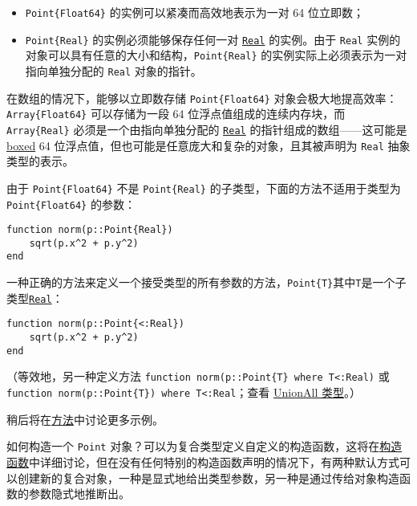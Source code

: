 \begin{itemize}
\item \texttt{Point\{Float64\}} 的实例可以紧凑而高效地表示为一对 64 位立即数；


\item \texttt{Point\{Real\}} 的实例必须能够保存任何一对 \hyperlink{6175959395021454412}{\texttt{Real}} 的实例。由于 \texttt{Real} 实例的对象可以具有任意的大小和结构，\texttt{Point\{Real\}} 的实例实际上必须表示为一对指向单独分配的 \texttt{Real} 对象的指针。

\end{itemize}


在数组的情况下，能够以立即数存储 \texttt{Point\{Float64\}} 对象会极大地提高效率：\texttt{Array\{Float64\}} 可以存储为一段 64 位浮点值组成的连续内存块，而 \texttt{Array\{Real\}} 必须是一个由指向单独分配的 \hyperlink{6175959395021454412}{\texttt{Real}} 的指针组成的数组——这可能是 \href{https://en.wikipedia.org/wiki/Object\_type\_\%28object-oriented\_programming\%29\#Boxing}{boxed} 64 位浮点值，但也可能是任意庞大和复杂的对象，且其被声明为 \texttt{Real} 抽象类型的表示。



由于 \texttt{Point\{Float64\}} 不是 \texttt{Point\{Real\}} 的子类型，下面的方法不适用于类型为 \texttt{Point\{Float64\}} 的参数：




\begin{verbatim}
function norm(p::Point{Real})
    sqrt(p.x^2 + p.y^2)
end
\end{verbatim}



一种正确的方法来定义一个接受类型的所有参数的方法，\texttt{Point\{T\}}其中\texttt{T}是一个子类型\hyperlink{6175959395021454412}{\texttt{Real}}：




\begin{verbatim}
function norm(p::Point{<:Real})
    sqrt(p.x^2 + p.y^2)
end
\end{verbatim}



（等效地，另一种定义方法 \texttt{function norm(p::Point\{T\} where T<:Real)} 或 \texttt{function norm(p::Point\{T\}) where T<:Real}；查看 \hyperlink{11072845175692859046}{UnionAll 类型}。）



稍后将在\hyperlink{3842379394166369470}{方法}中讨论更多示例。



如何构造一个 \texttt{Point} 对象？可以为复合类型定义自定义的构造函数，这将在\hyperlink{1489967485005487723}{构造函数}中详细讨论，但在没有任何特别的构造函数声明的情况下，有两种默认方式可以创建新的复合对象，一种是显式地给出类型参数，另一种是通过传给对象构造函数的参数隐式地推断出。



